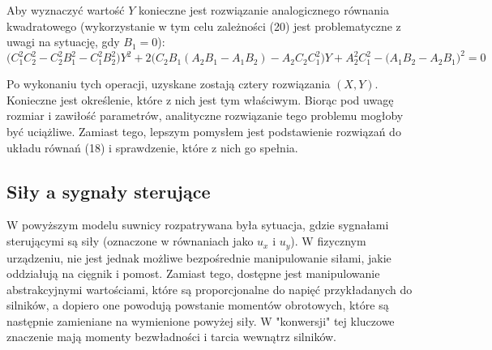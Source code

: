 \documentclass[10pt]{article}
\begin{document}
Aby wyznaczyć wartość $Y$ konieczne jest rozwiązanie analogicznego równania kwadratowego (wykorzystanie w tym celu zależności (20) jest problematyczne z uwagi na sytuację, gdy $B_1 = 0$):
\begin{equation}
\big(C_1^2 C_2^2 - C_2^2 B_1^2 - C_1^2 B_2^2 \big) Y^2 + 
2\big(C_2B_1 (A_2B_1 - A_1B_2) - A_2C_2C_1^2 \big) Y +
A_2^2 C_1^2 - \big(A_1B_2 - A_2B_1 \big)^2
 = 0
\end{equation}

Po wykonaniu tych operacji, uzyskane zostają cztery rozwiązania $(X,Y)$. Konieczne jest określenie, które z nich jest tym właściwym. Biorąc pod uwagę rozmiar i zawiłość parametrów, analityczne rozwiązanie tego problemu mogłoby być uciążliwe. Zamiast tego, lepszym pomysłem jest podstawienie rozwiązań do układu równań (18) i sprawdzenie, które z nich go spełnia.

\subsection*{Siły a sygnały sterujące}
W powyższym modelu suwnicy rozpatrywana była sytuacja, gdzie sygnałami sterującymi są siły (oznaczone w równaniach jako $u_x$ i $u_y$). W fizycznym urządzeniu, nie jest jednak możliwe bezpośrednie manipulowanie siłami, jakie oddziałują na cięgnik i pomost. Zamiast tego, dostępne jest manipulowanie abstrakcyjnymi wartościami, które są proporcjonalne do napięć przykładanych do silników, a dopiero one powodują powstanie momentów obrotowych, które są następnie zamieniane na wymienione powyżej siły. W "konwersji" tej kluczowe znaczenie mają momenty bezwładności i tarcia wewnątrz silników. 
\end{document}
